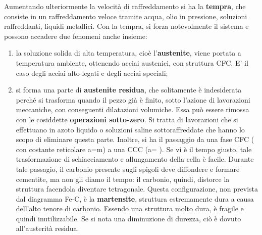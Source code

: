 Aumentando ulteriormente la velocità di raffreddamento si ha la \textbf{tempra}, che consiste in un raffreddamento veloce tramite acqua, olio in pressione, soluzioni raffreddanti, liquidi metallici. Con la tempra, si forza notevolmente il sistema e possono accadere due fenomeni anche insieme:
\begin{enumerate}
    \item la soluzione solida di alta temperatura, cioè l’\textbf{austenite}, viene portata a temperatura ambiente, ottenendo acciai austenici, con struttura CFC. E’ il caso degli acciai alto-legati e degli acciai speciali;
    \item si forma una parte di \textbf{austenite residua}, che solitamente è indesiderata perché si trasforma quando il pezzo già è finito, sotto l’azione di lavorazioni meccaniche, con conseguenti dilatazioni volumiche. Essa può essere rimossa con le cosiddette \textbf{operazioni sotto-zero}. Si tratta di lavorazioni che si effettuano in azoto liquido o soluzioni saline sottoraffreddate che hanno lo scopo di eliminare questa parte. Inoltre, si ha il passaggio da una fase CFC ( con costante reticolare a=m) a una CCC (a= ). Se vi è il tempo giusto, tale trasformazione di schiacciamento e allungamento della cella è facile. Durante tale passagio, il carbonio presente sugli spigoli deve diffondere e formare cementite, ma non gli diamo il tempo: il carbonio, quindi, distorce la struttura facendola diventare tetragonale. Questa configurazione, non prevista dal diagramma Fe-C, è la \textbf{martensite}, struttura estremamente dura a causa dell’alto tenore di carbonio. Essendo una struttura molto dura, è fragile e quindi inutilizzabile. Se si nota una diminuzione di durezza, ciò è dovuto all’austerità residua.
\end{enumerate}

